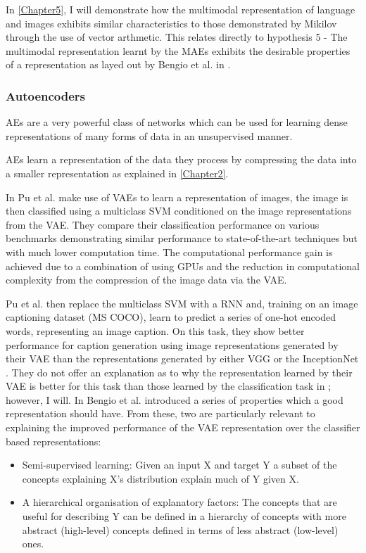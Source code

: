 In \autoref{Chapter5}, I will demonstrate how the multimodal representation of language and images exhibits similar characteristics to those demonstrated by Mikilov through the use of vector arthmetic. This relates directly to hypothesis 5 - The multimodal representation learnt by the \acp{MAE} exhibits the desirable properties of a representation as layed out by Bengio et al. in \cite{repRev}.


\subsubsection{Autoencoders}
\acp{AE} are a very powerful class of networks which can be used for learning dense representations of many forms of data in an unsupervised manner.

\acp{AE} learn a representation of the data they process by compressing the data into a smaller representation as explained in \autoref{Chapter2}.

In \cite{pu2016variational} Pu et al. make use of \acp{VAE} to learn a representation of images, the image is then classified using a multiclass \ac{SVM} conditioned on the image representations from the \ac{VAE}. They compare their classification performance on various benchmarks demonstrating similar performance to state-of-the-art techniques but with much lower computation time. The computational performance gain is achieved due to a combination of using \acp{GPU} and the reduction in computational complexity from the compression of the image data via the \ac{VAE}.

Pu et al. then replace the multiclass \ac{SVM} with a \ac{RNN} and, training on an image captioning dataset (MS COCO\cite{lin2014microsoft}), learn to predict a series of one-hot encoded words, representing an image caption. On this task, they show better performance for caption generation using image representations generated by their \ac{VAE} than the representations generated by either VGG \cite{simonyan2014very} or the InceptionNet \cite{szegedy2015going}. They do not offer an explanation as to why the representation learned by their \ac{VAE} is better for this task than those learned by the classification task in \cite{simonyan2014very, szegedy2015going}; however, I will.
In \cite{repRev} Bengio et al. introduced a series of properties which a good representation should have. From these, two are particularly relevant to explaining the improved performance of the \ac{VAE} representation over the classifier based representations:
\\
\begin{itemize}
	\item Semi-supervised learning: Given an input X and target Y a subset of the concepts explaining X's distribution explain much of Y given X.
	\item A hierarchical organisation of explanatory factors: The concepts that are useful for describing Y can be defined in a hierarchy of concepts with more abstract (high-level) concepts defined in terms of less abstract (low-level) ones.
	\vspace{1em}
\end{itemize}


